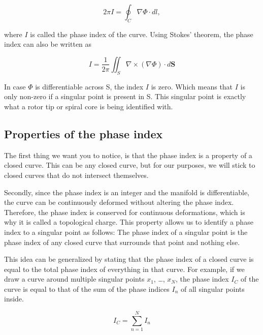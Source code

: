 \documentclass[twocolumn]{article}
\begin{document}
\begin{equation}
  2\pi I = \oint_C \nabla \Phi \cdot dl ,
  \label{eq:phase-index}
\end{equation}

\noindent where \(I\) is called the phase index of the curve. Using Stokes'
theorem, the phase index can also be written as

\begin{equation}
  I = \frac{1}{2\pi} \iint_S \nabla \times (\nabla \Phi) \cdot d\bm{S}
  \label{eq:phase-index-stokes}
\end{equation}

\noindent In case \(\Phi\) is differentiable across S, the index \(I\) is zero.
Which means that \(I\) is only non-zero if a singular point is present
in S. \autocite{herlin2012reconstruction} This singular point is exactly
what a rotor tip or spiral core is being identified with.

\subsection{Properties of the phase
index}\label{properties-of-the-phase-index}

The first thing we want you to notice, is that the phase index is a
property of a closed curve. This can be any closed curve, but for our
purposes, we will stick to closed curves that do not intersect
themselves.

Secondly, since the phase index is an integer and the manifold is
differentiable, the curve can be continuously deformed without altering
the phase index. Therefore, the phase index is conserved for continuous
deformations, which is why it is called a topological charge. This
property allows us to identify a phase index to a singular point as
follows: The phase index of a singular point is the phase index of any
closed curve that surrounds that point and nothing else.

This idea can be generalized by stating that the phase index of a closed
curve is equal to the total phase index of everything in that curve. For
example, if we draw a curve around multiple singular points \(x_1\),
\ldots, \(x_N\), the phase index \(I_C\) of the curve is equal to that
of the sum of the phase indices \(I_n\) of all singular points inside.

\begin{equation}
  I_C = \sum^N_{n=1} I_n
  \label{eq:index-curve}
\end{equation}
\end{document}
